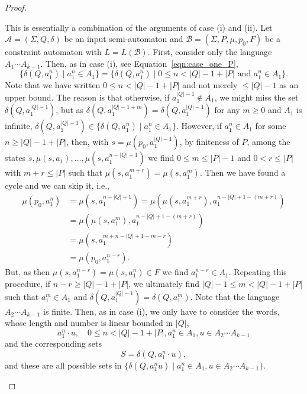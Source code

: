 \begin{proof}
\begin{enumerate}
  This is essentially a combination of the arguments of case (i) and (ii).
  Let $\mathcal A = (\Sigma, Q, \delta)$ be an input semi-automaton
  and $\mathcal B = (\Sigma, P, \mu, p_0, F)$
  be a constraint automaton with $L = L(\mathcal B)$.
  First, consider only the language $A_1 \cdots A_{k-1}$.
  Then, as in case (i), see Equation~\eqref{eqn:case_one_P},%
  \[
   \{ \delta(Q, a_1^n) \mid a_1^n \in A_1  \}
    = \{ \delta(Q, a_1^n) \mid 0 \le n < |Q| - 1 + |P|\mbox{ and } a_1^n \in A_1 \}.
  \]
  Note that we have written $0 \le n < |Q| - 1 + |P|$
  and not merely $\le |Q| - 1$ as an upper bound.
  The reason is that otherwise, if $a_1^{|Q|-1} \notin A_1$,
  we might miss the set $\delta(Q, a_1^{|Q|-1})$,
  but as $\delta(Q, a_1^{|Q|-1+m}) = \delta(Q, a_1^{|Q|-1})$
  for any $m \ge 0$ and $A_1$ is infinite, $\delta(Q, a_1^{|Q|-1}) \in \{ \delta(Q, a_1^n) \mid a_1^n \in A_1  \}$.
  However, if $a_1^n \in A_1$ for some $n \ge |Q| - 1 + |P|$,
  then, with $s = \mu(p_0, a_1^{|Q| - 1})$,
  by finiteness of $P$, among
  the states $s, \mu(s,a_1), \ldots, \mu(s, a_1^{n - |Q| + 1})$
  we find $0 \le m \le |P| - 1$ and $0 < r \le |P|$ with $m + r \le |P|$
  such that $\mu(s, a_1^{m+r}) = \mu(s, a_1^m)$.
  Then we have found a cycle and we can skip it, i.e.,
  \begin{align*}
   \mu(p_0, a_1^n) & = \mu(s, a_1^{n - |Q| + 1}) 
                     = \mu(\mu(s, a_1^{m+r}), a_1^{n - |Q| + 1 - (m+r)}) \\
                   & = \mu(\mu(s, a_1^m), a_1^{n - |Q| + 1 - (m+r)}) \\
                   & = \mu(s, a_1^{m + n - |Q| + 1 - m - r}) \\
                   & = \mu(p_0, a_1^{n-r}).
  \end{align*}
  But, as then $\mu(s, a_1^{n - r}) = \mu(s, a_1^n) \in F$
  we find $a_1^{n-r} \in A_1$. 
  Repeating this procedure, if $n - r \ge |Q| - 1 + |P|$,
  we ultimately find $|Q| - 1 \le m < |Q| - 1 + |P|$
  such that $a_1^m \in A_1$
  and $\delta(Q, a_1^{|Q| - 1}) = \delta(Q, a_1^m)$.
  Note that the language $A_2 \cdots A_{k-1}$
  is finite.
  Then, as in case (i), 
  we only have to consider the  words,
  whose length and number is linear bounded in $|Q|$,
  \[
   a_1^n \cdot u,\quad  0 \le n < |Q| - 1 + |P|, a_1^n \in A_1, u \in A_2 \cdots A_{k-1}
  \]
  and the corresponding sets
  \[
   S = \delta(Q, a_1^n \cdot u),
  \]
  and these are all possible sets in $\{ \delta(Q, a_1^n u) \mid a_1^n \in A_1, u \in A_2 \cdots A_{k-1} \}$.

\end{enumerate}
\end{proof}
